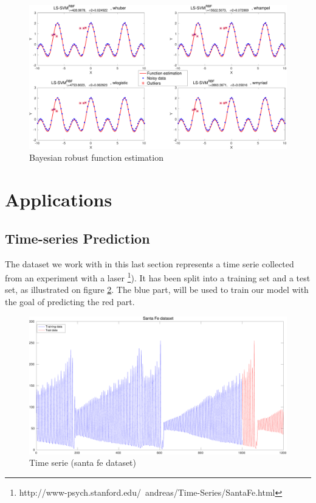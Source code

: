 \documentclass[11pt, a4paper]{article}
\begin{document}
\begin{figure}[H]
    \centering
    \includegraphics[scale=.40]{bayes_robust.pdf}
    \caption{Bayesian robust function estimation}
    \label{fig:bayes_robust}
\end{figure}

\section{Applications}

\subsection{Time-series Prediction}

The dataset we work with in this last section represents a time serie
collected from an experiment with a laser
\footnote{http://www-psych.stanford.edu/~andreas/Time-Series/SantaFe.html}). It
has been split into a training set and a test set, as illustrated on
figure \ref{fig:santa_fe}. The blue part, will be used to train our
model with the goal of predicting the red part.

\begin{figure}[H]
    \centering
    \includegraphics[scale=.40]{santafe_dataset.pdf}
    \caption{Time serie (santa fe dataset)}
    \label{fig:santa_fe}
\end{figure}
\end{document}
